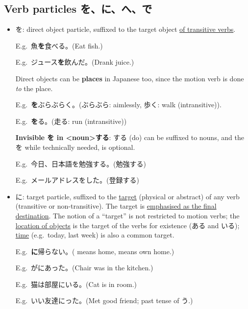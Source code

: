 \documentclass[../nihongo-gakushuu-kyouzai.tex]{subfiles}
\begin{document}
\subsection{Verb particles を、に、へ、で}
\begin{itemize}
    \item を: direct object particle, suffixed to the target object \ul{of transitive verbs}.

    E.g.\ 魚\textbf{を}食べる。(Eat fish.)

    E.g.\ ジュース\textbf{を}飲んだ。(Drank juice.)

    Direct objects can be \textbf{places} in Japanese too, since the motion verb is done \emph{to} the place. 

    E.g.\ \textbf{を}ぶらぶらく。(ぶらぶら: aimlessly, 歩く: walk (intransitive)).

    E.g.\ \textbf{を}る。(走る: run (intransitive))

    \textbf{Invisible を in <noun>する}: する (do) can be suffixed to nouns, and the を while technically needed, is optional.

    E.g.\ 今日、日本語を勉強\cancel{[を]}する。(勉強\cancel{[を]}する)

    E.g.\ メールアドレスを\cancel{[を]}した。(登録\cancel{[を]}する)
    \item に: target particle, suffixed to the \ul{target} (physical or abstract) of any verb (transitive or non-transitive). The target is \ul{emphasised as the final destination}. The notion of a ``target'' is not restricted to motion verbs; the \ul{location of objects} is the target of the verbs for existence (ある and いる); \ul{time} (e.g.\ today, last week) is also a common target.


    E.g.\ \textbf{に}帰らない。( means home,  means own home.)


    E.g.\ がにあった。(Chair was in the kitchen.)

    E.g.\ 猫は部屋にいる。(Cat is in room.)

    E.g.\ いい友達にった。(Met good friend; past tense of う.)


\end{itemize}
\end{document}
